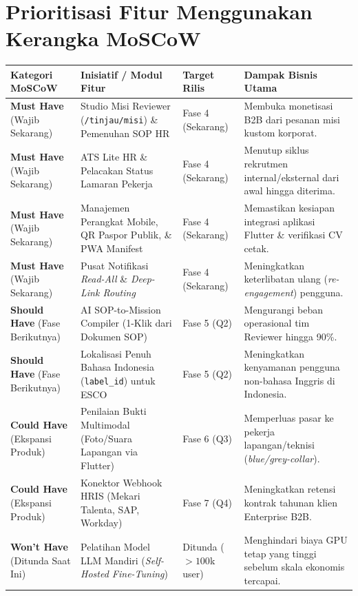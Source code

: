 \documentclass[11pt,a4paper]{report}
\begin{document}
\section{Prioritisasi Fitur Menggunakan Kerangka MoSCoW}

\renewcommand{\arraystretch}{1.35}
\begin{longtable}{L{2.8cm} L{4.6cm} L{3.2cm} L{3.8cm}}
\toprule
\textbf{Kategori MoSCoW} & \textbf{Inisiatif / Modul Fitur} & \textbf{Target Rilis} & \textbf{Dampak Bisnis Utama} \\
\midrule
\endhead
\textbf{Must Have} \newline (Wajib Sekarang) & Studio Misi Reviewer (\texttt{/tinjau/misi}) \& Pemenuhan SOP HR & Fase 4 (Sekarang) & Membuka monetisasi B2B dari pesanan misi kustom korporat. \\
\textbf{Must Have} \newline (Wajib Sekarang) & ATS Lite HR \& Pelacakan Status Lamaran Pekerja & Fase 4 (Sekarang) & Menutup siklus rekrutmen internal/eksternal dari awal hingga diterima. \\
\textbf{Must Have} \newline (Wajib Sekarang) & Manajemen Perangkat Mobile, QR Paspor Publik, \& PWA Manifest & Fase 4 (Sekarang) & Memastikan kesiapan integrasi aplikasi Flutter \& verifikasi CV cetak. \\
\textbf{Must Have} \newline (Wajib Sekarang) & Pusat Notifikasi \textit{Read-All} \& \textit{Deep-Link Routing} & Fase 4 (Sekarang) & Meningkatkan keterlibatan ulang (\textit{re-engagement}) pengguna. \\
\midrule
\textbf{Should Have} \newline (Fase Berikutnya) & AI SOP-to-Mission Compiler (1-Klik dari Dokumen SOP) & Fase 5 (Q2) & Mengurangi beban operasional tim Reviewer hingga 90\%. \\
\textbf{Should Have} \newline (Fase Berikutnya) & Lokalisasi Penuh Bahasa Indonesia (\texttt{label\_id}) untuk ESCO & Fase 5 (Q2) & Meningkatkan kenyamanan pengguna non-bahasa Inggris di Indonesia. \\
\midrule
\textbf{Could Have} \newline (Ekspansi Produk) & Penilaian Bukti Multimodal (Foto/Suara Lapangan via Flutter) & Fase 6 (Q3) & Memperluas pasar ke pekerja lapangan/teknisi (\textit{blue/grey-collar}). \\
\textbf{Could Have} \newline (Ekspansi Produk) & Konektor Webhook HRIS (Mekari Talenta, SAP, Workday) & Fase 7 (Q4) & Meningkatkan retensi kontrak tahunan klien Enterprise B2B. \\
\midrule
\textbf{Won't Have} \newline (Ditunda Saat Ini) & Pelatihan Model LLM Mandiri (\textit{Self-Hosted Fine-Tuning}) & Ditunda ($>100$k user) & Menghindari biaya GPU tetap yang tinggi sebelum skala ekonomis tercapai. \\
\bottomrule
\end{longtable}
\end{document}

